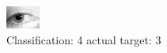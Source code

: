 \begin{figure}[h!]
\begin{center}
\includegraphics[width=0.60\columnwidth]{figures/ID1416_class_4_target_3.png}
\end{center}
\caption{ Classification: 4 actual target: 3}
\label{fig:ID1416_class_4_target_3}
\end{figure}

